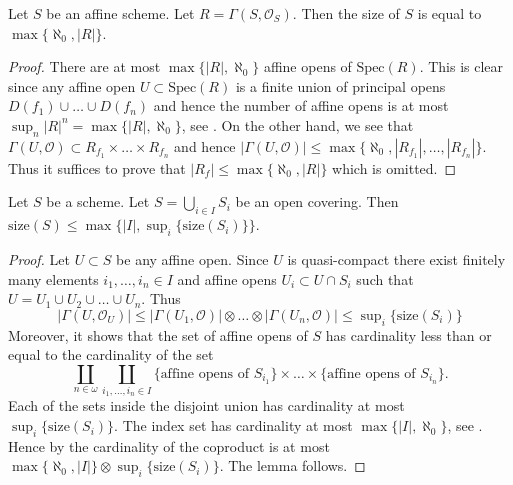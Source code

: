 \begin{lemma}
\label{lemma-bound-affine}
Let $S$ be an affine scheme.
Let $R = \Gamma(S, \mathcal{O}_S)$.
Then the size of $S$ is equal to $\max\{ \aleph_0, |R|\}$.
\end{lemma}

\begin{proof}
There are at most $\max\{|R|, \aleph_0\}$ affine opens of
$\text{Spec}(R)$. This is clear since any affine open
$U \subset \text{Spec}(R)$ is a finite union of principal
opens $D(f_1) \cup \ldots \cup D(f_n)$ and hence the number
of affine opens is at most $\sup_n |R|^n = \max\{|R|, \aleph_0\}$,
see \cite[Ch. I, 10.13]{Kunen}. On the other hand, we see that
$\Gamma(U, \mathcal{O}) \subset R_{f_1} \times \ldots \times R_{f_n}$
and hence $|\Gamma(U, \mathcal{O})| \leq 
\max\{\aleph_0, |R_{f_1}|, \ldots, |R_{f_n}|\}$. Thus
it suffices to prove that $|R_f| \leq \max\{\aleph_0, |R|\}$
which is omitted.
\end{proof}

\begin{lemma}
\label{lemma-bound-size}
Let $S$ be a scheme. Let $S = \bigcup_{i \in I} S_i$ be
an open covering. Then
$\text{size}(S) \leq \max\{|I|, \sup_i\{\text{size}(S_i)\}\}$.
\end{lemma}

\begin{proof}
Let $U \subset S$ be any affine open. Since $U$ is quasi-compact
there exist finitely many elements $i_1, \ldots, i_n \in I$
and affine opens $U_i \subset U \cap S_i$ such that
$U = U_1 \cup U_2 \cup \ldots \cup U_n$. Thus
$$
|\Gamma(U, \mathcal{O}_U)|
\leq
|\Gamma(U_1, \mathcal{O})|
\otimes
\ldots
\otimes
|\Gamma(U_n, \mathcal{O})|
\leq \sup\nolimits_i\{\text{size}(S_i)\}
$$
Moreover, it shows that the set of affine opens of $S$ has
cardinality less than or equal to the cardinality of the set
$$
\coprod_{n \in \omega}
\coprod_{i_1, \ldots, i_n \in I}
\{\text{affine opens of }S_{i_1}\}
\times
\ldots
\times
\{\text{affine opens of }S_{i_n}\}.
$$
Each of the sets inside the disjoint union has cardinality at most
$\sup_i\{\text{size}(S_i)\}$. The index set has cardinality at most
$\max\{|I|, \aleph_0\}$, see \cite[Ch. I, 10.13]{Kunen}.
Hence by \cite[Lemma 5.8]{Jech} the cardinality
of the coproduct is at most $\max\{\aleph_0, |I|\}
\otimes \sup_i\{\text{size}(S_i)\}$. The lemma follows.
\end{proof}

